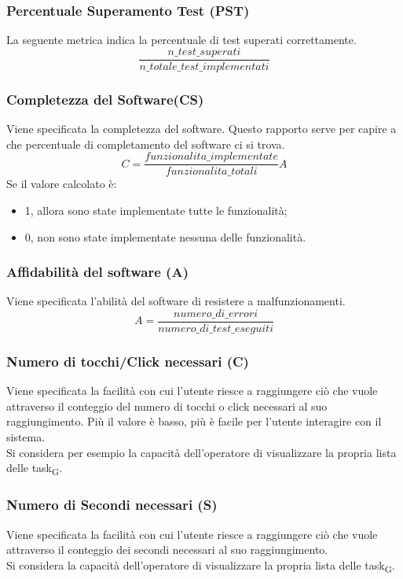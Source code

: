 \subsubsection{Percentuale Superamento Test (PST)}
La seguente metrica indica la percentuale di test superati correttamente.
\[\frac{n\_test\_superati}{n\_totale\_test\_implementati}\]

\subsubsection{Completezza del Software(CS)}
Viene specificata la completezza del software. Questo rapporto serve per capire a che percentuale di completamento del software ci si trova. 
\[C = \frac{funzionalita\_implementate }{funzionalita\_totali}A\]
Se il valore calcolato è:
\begin{itemize}
    \item 1, allora sono state implementate tutte le funzionalità;
    \item 0, non sono state implementate nessuna delle funzionalità.
\end{itemize}

\subsubsection{Affidabilità del software (A)}
Viene specificata l'abilità del software di resistere a malfunzionamenti.
\[A = \frac{numero\_di\_errori}{numero\_di\_test\_eseguiti}\]

\subsubsection{Numero di tocchi/Click necessari (C)}
Viene specificata la facilità con cui l'utente riesce a raggiungere ciò che vuole attraverso il conteggio del numero di tocchi o click necessari al suo raggiungimento. Più il valore è basso, più è facile per l'utente interagire con il sistema.\\
Si considera per esempio la capacità dell'operatore di visualizzare la propria lista delle task\textsubscript{G}.

\subsubsection{Numero di Secondi necessari (S)}
Viene specificata la facilità con cui l'utente riesce a raggiungere ciò che vuole attraverso il conteggio dei secondi necessari al suo raggiungimento.\\
Si considera la capacità dell'operatore di visualizzare la propria lista delle task\textsubscript{G}.


